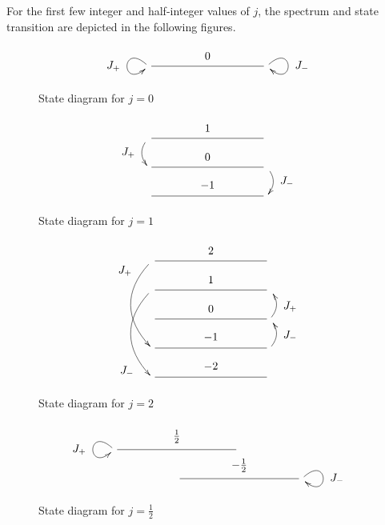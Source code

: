 For the first few integer and half-integer values of $j$, the spectrum
and state transition are depicted in the following figures.
\begin{figure}[!h]
  \[
  \xymatrix@R=20pt@C=100pt{
    \ar@(ul,dl)[]_*+{J_+} \ar@{-}[r]^-*+{0} & \ar@(ur,dr)[]^*+{J_-}
  }
  \]
  \caption{State diagram for $j=0$}
  \label{J0Diagram}
\end{figure}
\pagebreak
\begin{figure}[!h]
  \[
  \xymatrix@R=20pt@C=100pt{
    \ar@/_/[d]_*+{J_+} \ar@{-}[r]^-*+{1} & \\
    \ar@{-}[r]^-*+{0} & \ar@/^/[d]^*+{J_-} \\
    \ar@{-}[r]^-*+{-1} &  \\
  }
  \]
  \caption{State diagram for $j=1$}
  \label{J1Diagram}
\end{figure}
\begin{figure}[!h]
  \[
  \xymatrix@R=20pt@C=100pt{
    \ar@(dl,ul)[ddd]_<<<<<*+{J_+} \ar@{-}[r]^-*+{2} & \\
    \ar@(dl,ul)[ddd]_>>>>>*+{J_-} \ar@{-}[r]^-*+{1} & \\
    \ar@{-}[r]^-*+{0} & \ar@/_/[u]_-*+{J_+} \\
    \ar@{-}[r]^-*+{-1} & \ar@/_/[u]_-*+{J_-} \\
    \ar@{-}[r]^-*+{-2} &
  }
  \]
  \caption{State diagram for $j=2$}
  \label{J2Diagram}
\end{figure}
\begin{figure}[!h]
  \[
  \xymatrix@R=20pt@C=50pt{
    \ar@(ul,dl)[]_*+{J_+} \ar@{-}[rr]^-*+{\frac12} & & \\
                                                  & \ar@{-}[rr]^-*+{-\frac12} & & \ar@(ur,dr)[]^*+{J_-} \\
  }
  \]
  \caption{State diagram for $j=\frac12$}
  \label{J1/2Diagram}
\end{figure}
